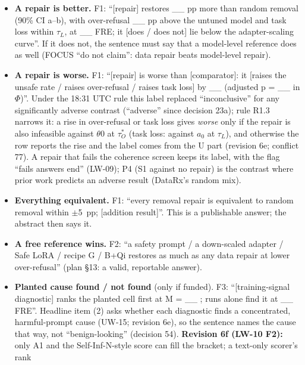\documentclass{article}
\theoremstyle{plain}
\theoremstyle{definition}
\theoremstyle{remark}
\begin{document}
\begin{itemize}
  \item \textbf{A repair is better.} F1: ``[repair] restores \_\_ pp more than
        random removal (90\% CI a--b), with over-refusal \_\_ pp above the
        untuned model and task loss within $\tau_{L}$, at \_\_ FRE; it [does /
        does not] lie below the adapter-scaling curve''. If it does not, the
        sentence must say that a model-level reference does as well (FOCUS ``do
        not claim'': data repair beats model-level repair).
  \item \textbf{A repair is worse.} F1: ``[repair] is worse than [comparator]:
        it [raises the unsafe rate / raises over-refusal / raises task loss] by
        \_\_ (adjusted p = \_\_ in $\Phi$)''. Under the 18:31 UTC rule this
        label replaced ``inconclusive'' for any significantly adverse contrast
        (``adverse'' since decision 23a); rule R1.3 narrows it: a rise in
        over-refusal or task loss gives \emph{worse} only if the repair is also
        infeasible against $\theta$0 at $\tau_O^*$ (task loss: against $a_0$ at
        $\tau_{L}$), and otherwise the row reports the rise and the label comes
        from the U part (revision 6e; conflict 77). A repair that fails the
        coherence screen keeps its label, with the flag ``fails answers end''
        (LW-09); P4 (S1 against no repair) is the contrast where prior work
        predicts an adverse result (DataRx's random mix).
  \item \textbf{Everything equivalent.} F1: ``every removal repair is equivalent
        to random removal within $\pm$5~pp; [addition result]''. This is a
        publishable answer; the abstract then says it.
  \item \textbf{A free reference wins.} F2: ``a safety prompt / a down-scaled
        adapter / Safe LoRA / recipe G / B+Qi restores as much as any data
        repair at lower over-refusal'' (plan \S{}13: a valid, reportable
        answer).
  \item \textbf{Planted cause found / not found} (only if funded). F3:
        ``[training-signal diagnostic] ranks the planted cell first at M = \_\_
        ; runs alone find it at \_\_ FRE''. Headline item (2) asks whether each
        diagnostic finds a concentrated, harmful-prompt cause (UW-15; revision
        6e), so the sentence names the cause that way, not ``benign-looking''
        (decision 54). \textbf{Revision 6f (LW-10 F2):} only A1 and the
        Self-Inf-N-style score can fill the bracket; a text-only scorer's rank

\end{itemize}
\end{document}
